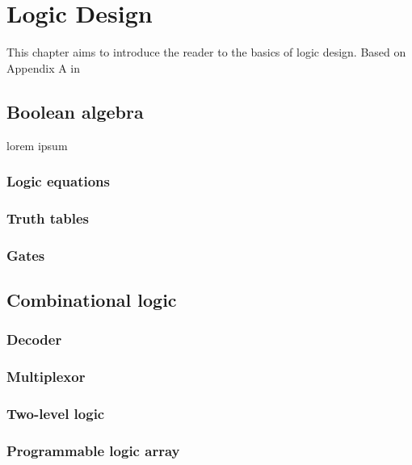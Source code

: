 \chapter{Logic Design}
This chapter aims to introduce the reader to the basics of logic design. Based on Appendix A in \cite{riscVbook}

\section{Boolean algebra}
lorem ipsum
    
    \subsection{Logic equations}
    
    \subsection{Truth tables}
    
    \subsection{Gates}
    
\section{Combinational logic}
    
    \subsection{Decoder}
    
    \subsection{Multiplexor}
    
    \subsection{Two-level logic}
    
    \subsection{Programmable logic array}